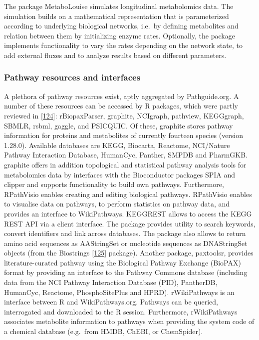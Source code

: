 \documentclass[]{article}
\begin{document}
The package MetaboLouise simulates longitudinal metabolomics data. The simulation builds on a mathematical representation that is parameterized according to underlying biological networks, i.e.~by defining metabolites and relation between them by initializing enzyme rates. Optionally, the package implements functionality to vary the rates depending on the network state, to add external fluxes and to analyze results based on different parameters.

\hypertarget{pathway-resources-and-interfaces}{%
\subsubsection{Pathway resources and interfaces}\label{pathway-resources-and-interfaces}}

A plethora of pathway resources exist, aptly aggregated by Pathguide.org. A number of these resources can be accessed by R packages, which were partly reviewed in {[}\protect\hyperlink{ref-kramer_2014}{124}{]}: rBiopaxParser, graphite, NCIgraph, pathview, KEGGgraph, SBMLR, rsbml, gaggle, and PSICQUIC. Of these, graphite stores pathway information for proteins and metabolites of currently fourteen species (version 1.28.0). Available databases are KEGG, Biocarta, Reactome, NCI/Nature Pathway Interaction Database, HumanCyc, Panther, SMPDB and PharmGKB. graphite offers in addition topological and statistical pathway analysis tools for metabolomics data by interfaces with the Bioconductor packages SPIA and clipper and supports functionality to build own pathways. Furthermore, RPathVisio enables creating and editing biological pathways. RPathVisio enables to visualise data on pathways, to perform statistics on pathway data, and provides an interface to WikiPathways. KEGGREST allows to access the KEGG REST API via a client interface. The package provides utility to search keywords, convert identifiers and link across databases. The package also allows to return amino acid sequences as AAStringSet or nucleotide sequences as DNAStringSet objects (from the Biostrings {[}\protect\hyperlink{ref-tenenbaum_website_2019}{125}{]} package).
Another package, paxtoolsr, provides literature-curated pathway using the Biological Pathway Exchange (BioPAX) format by providing an interface to the Pathway Commons database (including data from the NCI Pathway Interaction Database (PID), PantherDB, HumanCyc, Reactome, PhosphoSitePlus and HPRD). rWikiPathways is an interface between R and WikiPathways.org. Pathways can be queried, interrogated and downloaded to the R session. Furthermore, rWikiPathways associates metabolite information to pathways when providing the system code of a chemical database (e.g.~from HMDB, ChEBI, or ChemSpider).
\end{document}
